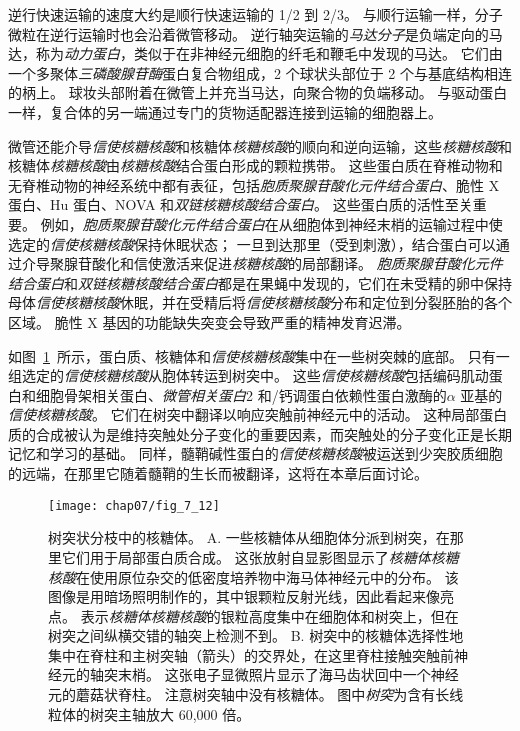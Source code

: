 逆行快速运输的速度大约是顺行快速运输的 1/2 到 2/3。
与顺行运输一样，分子微粒在逆行运输时也会沿着微管移动。
逆行轴突运输的\textit{马达分子}是负端定向的马达，称为\textit{动力蛋白}，类似于在非神经元细胞的纤毛和鞭毛中发现的马达。
它们由一个多聚体\textit{三磷酸腺苷酶}蛋白复合物组成，2 个球状头部位于 2 个与基底结构相连的柄上。
球妆头部附着在微管上并充当马达，向聚合物的负端移动。
与驱动蛋白一样，复合体的另一端通过专门的货物适配器连接到运输的细胞器上。


微管还能介导\textit{信使核糖核酸}和核糖体\textit{核糖核酸}的顺向和逆向运输，这些\textit{核糖核酸}和核糖体\textit{核糖核酸}由\textit{核糖核酸}结合蛋白形成的颗粒携带。
这些蛋白质在脊椎动物和无脊椎动物的神经系统中都有表征，包括\textit{胞质聚腺苷酸化元件结合蛋白}、脆性 X 蛋白、Hu 蛋白、NOVA 和\textit{双链核糖核酸结合蛋白}。
这些蛋白质的活性至关重要。
例如，\textit{胞质聚腺苷酸化元件结合蛋白}在从细胞体到神经末梢的运输过程中使选定的\textit{信使核糖核酸}保持休眠状态；
一旦到达那里（受到刺激），结合蛋白可以通过介导聚腺苷酸化和信使激活来促进\textit{核糖核酸}的局部翻译。
\textit{胞质聚腺苷酸化元件结合蛋白}和\textit{双链核糖核酸结合蛋白}都是在果蝇中发现的，它们在未受精的卵中保持母体\textit{信使核糖核酸}休眠，并在受精后将\textit{信使核糖核酸}分布和定位到分裂胚胎的各个区域。
脆性 X 基因的功能缺失突变会导致严重的精神发育迟滞。


如图~\ref{fig:7_12}~所示，蛋白质、核糖体和\textit{信使核糖核酸}集中在一些树突棘的底部。
只有一组选定的\textit{信使核糖核酸}从胞体转运到树突中。
这些\textit{信使核糖核酸}包括编码肌动蛋白和细胞骨架相关蛋白、\textit{微管相关蛋白}2 和/钙调蛋白依赖性蛋白激酶的$\alpha$ 亚基的\textit{信使核糖核酸}。
它们在树突中翻译以响应突触前神经元中的活动。
这种局部蛋白质的合成被认为是维持突触处分子变化的重要因素，而突触处的分子变化正是长期记忆和学习的基础。
同样，髓鞘碱性蛋白的\textit{信使核糖核酸}被运送到少突胶质细胞的远端，在那里它随着髓鞘的生长而被翻译，这将在本章后面讨论。


\begin{figure}[htbp]
	\centering
	\texttt{[image: chap07/fig\_7\_12]}
	\caption{树突状分枝中的核糖体。
		A. 一些核糖体从细胞体分派到树突，在那里它们用于局部蛋白质合成。
		这张放射自显影图显示了\textit{核糖体核糖核酸}在使用原位杂交的低密度培养物中海马体神经元中的分布。
		该图像是用暗场照明制作的，其中银颗粒反射光线，因此看起来像亮点。
		表示\textit{核糖体核糖核酸}的银粒高度集中在细胞体和树突上，但在树突之间纵横交错的轴突上检测不到。
		B. 树突中的核糖体选择性地集中在脊柱和主树突轴（箭头）的交界处，在这里脊柱接触突触前神经元的轴突末梢。
		这张电子显微照片显示了海马齿状回中一个神经元的蘑菇状脊柱。
		注意树突轴中没有核糖体。
		图中\textit{树突}为含有长线粒体的树突主轴放大 60,000 倍。}
	\label{fig:7_12}
\end{figure}


